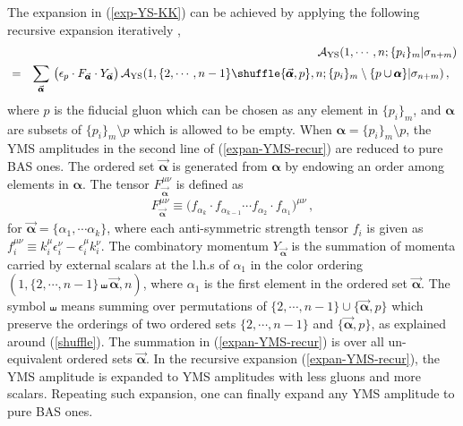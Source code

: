 \documentclass[preprint,showpacs,onecolumn,nofootinbib]{revtex4}
\newcommand{\bea}{\begin{eqnarray}}
\newcommand{\eea}{\end{eqnarray}}
\newcommand{\nn}{\nonumber \\}
\def\eref#1{(\ref{#1})}
\def\a{{\alpha}}
\begin{document}
The expansion in \eref{exp-YS-KK} can be achieved by applying the following recursive expansion iteratively \cite{Fu:2017uzt,Teng:2017tbo,Feng:2019tvb},
%
\bea
& &{\cal A}_{\rm YS}(1,\cdots,n;\{p_i\}_m|\sigma_{n+m})\nn
&=&\sum_{\vec{\pmb{\a}}}\,\big(\epsilon_p\cdot F_{\vec{\pmb{\a}}}\cdot Y_{\vec{\pmb{\a}}}\big)\,{\cal A}_{\rm YS}(1,\{2,\cdots,n-1\}\shuffle \{\vec{\pmb{\a}},p\},n;\{p_i\}_m\setminus\{p\cup\pmb{\a}\}|\sigma_{n+m})\,,~~\label{expan-YMS-recur}
\eea
%
where $p$ is the fiducial gluon which can be chosen as any element in $\{p_i\}_m$, and $\pmb{\a}$ are subsets of $\{p_i\}_m\setminus p$ which is allowed to be empty. When $\pmb{\a}=\{p_i\}_m\setminus p$, the YMS amplitudes in the second line of \eref{expan-YMS-recur} are reduced to pure BAS ones. The ordered set $\vec{\pmb{\a}}$ is generated from $\pmb{\a}$
by endowing an order among elements in $\pmb{\a}$. The tensor $F^{\mu\nu}_{\vec{\pmb{\a}}}$ is defined as
%
\bea
F^{\mu\nu}_{\vec{\pmb{\a}}}\equiv\big(f_{\a_k}\cdot f_{\a_{k-1}}\cdots f_{\a_2}\cdot f_{\a_1}\big)^{\mu\nu}\,,
\eea
%
for $\vec{\pmb{\a}}=\{\a_1,\cdots\a_k\}$, where each anti-symmetric strength tensor $f_i$ is given as $f^{\mu\nu}_i\equiv k^\mu_i\epsilon^\nu_i-\epsilon^\mu_i k^\nu_i$. The combinatory momentum $Y_{\vec{\pmb{\a}}}$ is the summation of momenta carried by external scalars at the l.h.s of $\a_1$ in the color ordering $(1,\{2,\cdots,n-1\}\shuffle \vec{\pmb{\a}},n)$, where $\a_1$ is the first element in the ordered set $\vec{\pmb{\a}}$. The symbol $\shuffle$ means summing over permutations of $\{2,\cdots,n-1\}\cup\{\vec{\pmb{\a}},p\}$ which preserve the orderings of two ordered sets $\{2,\cdots,n-1\}$ and $\{\vec{\pmb{\a}},p\}$, as explained around \eref{shuffle}. The summation in \eref{expan-YMS-recur} is over all un-equivalent ordered sets $\vec{\pmb{\a}}$. In the recursive expansion \eref{expan-YMS-recur}, the YMS amplitude is expanded to YMS amplitudes with less gluons and more scalars. Repeating such expansion, one can finally expand any YMS amplitude to pure BAS ones.
\end{document}
